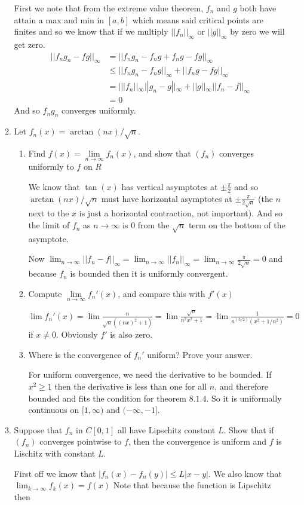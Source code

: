 \documentclass[letterpaper]{article}
\begin{document}
\begin{enumerate}
\begin{enumerate}
  First we note that from the extreme value theorem, $f_n$ and $g$ both have attain a max and min in $[a,b]$ which means said critical points are finites and so we know that if we multiply $||f_n||_\infty$ or $||g||_\infty$ by zero  we will get zero.
  \begin{align*}
    ||f_ng_n-fg||_\infty&=||f_ng_n-f_ng+f_ng-fg||_\infty\\
    &\le||f_ng_n-f_ng||_\infty+||f_ng-fg||_\infty\\
    &=|||f_n||_\infty||g_n-g||_\infty+||g||_\infty||f_n-f||_\infty\\
    &=0
  \end{align*}
  And so $f_ng_n$ converges uniformly.
  \setcounter{enumii}{5}
  \item
  Let $f_n(x)=\arctan(nx)/\sqrt{n}$.
    \begin{enumerate}
    \item
    Find $f(x)=\lim\limits_{n\to\infty}f_n(x)$, and show that $(f_n)$ converges uniformly to $f$ on $R$

    We know that $\tan(x)$ has vertical asymptotes at $\displaystyle\pm \frac{\pi}{2}$ and so $\arctan(nx)/\sqrt{n}$ must have horizontal asymptotes at $\displaystyle\pm \frac{\pi}{2\sqrt{n}}$ (the $n$ next to the $x$ is just a horizontal contraction, not important). And so the limit of $f_n$ as $n\to\infty$ is $0$ from the $\sqrt{n}$ term on the bottom of the asymptote.

    Now $\lim_{n\to\infty}||f_n-f||_\infty=\lim_{n\to\infty}||f_n||_\infty=\lim_{n\to\infty}\frac{\pi}{2\sqrt{n}}=0$ and because $f_n$ is bounded then it is uniformly convergent.
    \item
    Compute $\lim\limits_{n\to\infty}f_n'(x)$, and compare this with $f'(x)$

    $\displaystyle \lim f_n'(x)=\lim \frac{n}{\sqrt{n}((nx)^2+1)}=\lim\frac{\sqrt{n}}{n^2x^2+1}=\lim\frac{1}{n^{(3/2)}(x^2+1/n^2)}=0$ if $x\ne 0$. Obviously $f'$ is also zero.

    \item
    Where is the convergence of $f_n'$ uniform? Prove your answer.

    For uniform convergence, we need the derivative to be bounded. If $x^2\ge 1$ then the derivative is less than one for all $n$, and therefore bounded and fits the condition for theorem $8.1.4$. So it is uniformally continuous on $[1,\infty)$ and $(-\infty,-1]$.
    \end{enumerate}
  \setcounter{enumii}{7}
  \item
  Suppose that $f_n$ in $C[0,1]$ all have Lipschitz constant $L$. Show that if $(f_n)$ converges pointwise to $f$, then the convergence is uniform and $f$ is Lischitz with constant $L$.

  First off we know that $|f_n(x)-f_n(y)|\le L|x-y|$.
  We also know that $\lim_{k\to\infty}f_k(x)=f(x)$
  Note that because the function is Lipschitz then 
  \end{enumerate}
\end{enumerate}
\end{document}
